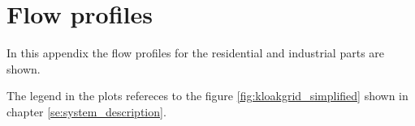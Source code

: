 \newpage
\section{Flow profiles}\label{app:flow_profiles}
In this appendix the flow profiles for the residential and industrial parts are shown.

The legend in the plots refereces to the figure \ref{fig:kloakgrid_simplified} shown in chapter \ref{se:system_description}. 



